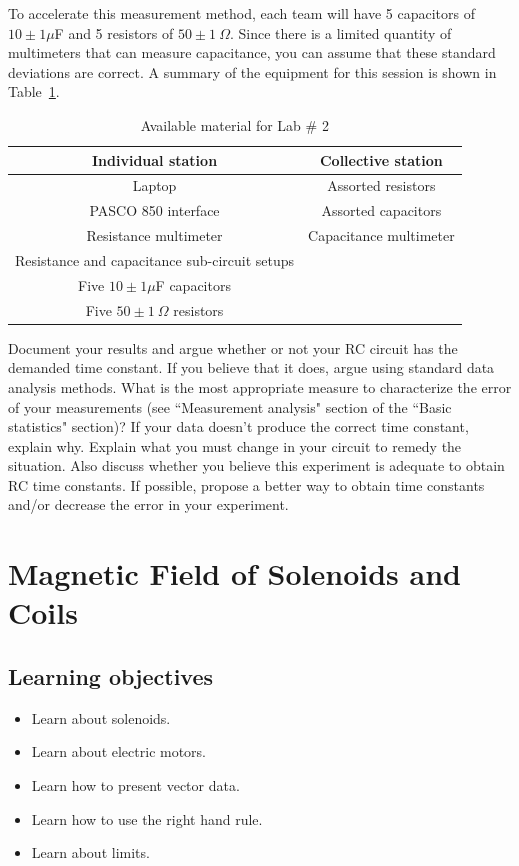 \documentclass[12pt]{report}
\begin{document}
To accelerate this measurement method, each team will have 5 capacitors of $10\pm 1\mu$F and 5 resistors of $50\pm 1 \ \Omega$. Since there is a limited quantity of multimeters that can measure capacitance, you can assume that these standard deviations are correct. A summary of the equipment for this session is shown in Table~\ref{Tab:Lab2-material}.
\begin{table}[h]
\centering
\begin{tabular}{||c | c ||}
\hline
Individual station & Collective station\\ \hline
Laptop & Assorted resistors \\
PASCO 850 interface & Assorted capacitors \\
Resistance multimeter & Capacitance multimeter \\
Resistance and capacitance sub-circuit setups & \\
Five $10\pm 1 \mu$F capacitors & \\
Five $50 \pm 1 \ \Omega$ resistors &  \\
\hline
\end{tabular}
\caption{Available material for Lab \# 2}
\label{Tab:Lab2-material}
\end{table}

Document your results and argue whether or not your RC circuit has the demanded time constant. If you believe that it does, argue using standard data analysis methods. What is the most appropriate measure to characterize the error of your measurements (see ``Measurement analysis" section of the ``Basic statistics" section)? If your data doesn't produce the correct time constant, explain why. Explain what you must change in your circuit to remedy the situation. Also discuss whether you believe this experiment is adequate to obtain RC time constants. If possible, propose a better way to obtain time constants and/or decrease the error in your experiment.

\chapter{Magnetic Field of Solenoids and Coils}
\section{Learning objectives}
\begin{itemize}
\item Learn about solenoids.
\item Learn about electric motors.
\item Learn how to present vector data.
\item Learn how to use the right hand rule.
\item Learn about limits.
\end{itemize}
\end{document}
